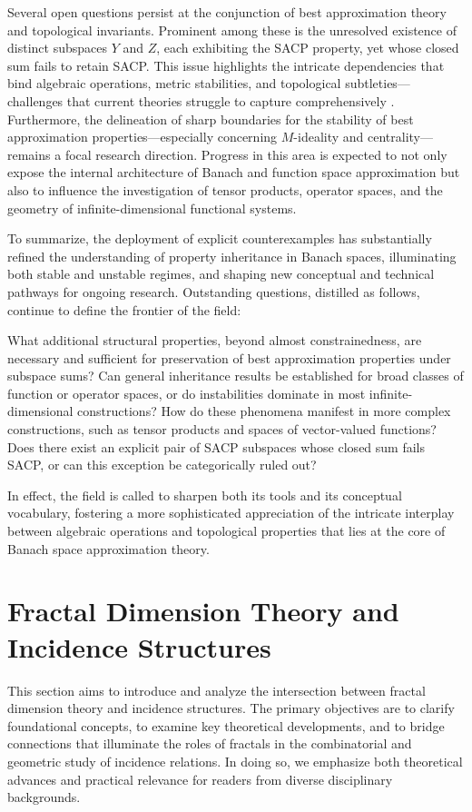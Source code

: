 \documentclass[sigconf]{acmart}
\begin{document}
Several open questions persist at the conjunction of best approximation theory and topological invariants. Prominent among these is the unresolved existence of distinct subspaces $Y$ and $Z$, each exhibiting the SACP property, yet whose closed sum fails to retain SACP. This issue highlights the intricate dependencies that bind algebraic operations, metric stabilities, and topological subtleties—challenges that current theories struggle to capture comprehensively \cite{ref103}. Furthermore, the delineation of sharp boundaries for the stability of best approximation properties—especially concerning $M$-ideality and centrality—remains a focal research direction. Progress in this area is expected to not only expose the internal architecture of Banach and function space approximation but also to influence the investigation of tensor products, operator spaces, and the geometry of infinite-dimensional functional systems.

To summarize, the deployment of explicit counterexamples has substantially refined the understanding of property inheritance in Banach spaces, illuminating both stable and unstable regimes, and shaping new conceptual and technical pathways for ongoing research. Outstanding questions, distilled as follows, continue to define the frontier of the field:

What additional structural properties, beyond almost constrainedness, are necessary and sufficient for preservation of best approximation properties under subspace sums?
Can general inheritance results be established for broad classes of function or operator spaces, or do instabilities dominate in most infinite-dimensional constructions?
How do these phenomena manifest in more complex constructions, such as tensor products and spaces of vector-valued functions?
Does there exist an explicit pair of SACP subspaces whose closed sum fails SACP, or can this exception be categorically ruled out?

In effect, the field is called to sharpen both its tools and its conceptual vocabulary, fostering a more sophisticated appreciation of the intricate interplay between algebraic operations and topological properties that lies at the core of Banach space approximation theory.

\section{Fractal Dimension Theory and Incidence Structures}

This section aims to introduce and analyze the intersection between fractal dimension theory and incidence structures. The primary objectives are to clarify foundational concepts, to examine key theoretical developments, and to bridge connections that illuminate the roles of fractals in the combinatorial and geometric study of incidence relations. In doing so, we emphasize both theoretical advances and practical relevance for readers from diverse disciplinary backgrounds.
\end{document}
